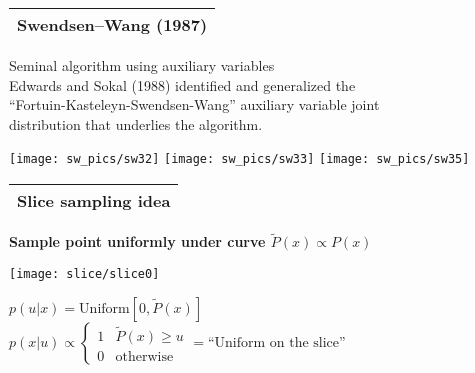 \documentclass[25pt,landscape]{foils}
\newcommand{\Gray}{\textcolor{mygray}}
\newcommand{\Green}{\textcolor{mypine}}
\newcommand{\myfoilhead}[1]{
\newpage
\vspace*{-1cm}
\Gray{
\begin{tabular*}{\textwidth}{l}
{\bf \Huge #1} \\
\bottomrule
\end{tabular*}}}
\newcommand{\te}{\!=\!}
\begin{document}
\vfill




\myfoilhead{Swendsen--Wang (1987)}

\vfill

Seminal algorithm using auxiliary variables\\

Edwards and Sokal (1988) identified and generalized the\\
``Fortuin-Kasteleyn-Swendsen-Wang'' auxiliary variable joint\\
distribution that underlies the algorithm.

\vfill

\hspace*{-0.9cm}
\texttt{[image: sw\_pics/sw32]}
\texttt{[image: sw\_pics/sw33]}
\texttt{[image: sw\_pics/sw35]}

\vspace*{-0.5cm}

\myfoilhead{Slice sampling idea}

\vspace*{1.5cm}

\Green{\bf Sample point uniformly under curve $\tilde{P}(x)\propto P(x)$}

\vfill

\centerline{\texttt{[image: slice/slice0]}}

\vfill

\hspace*{2cm} $p(u|x)=\mbox{Uniform}[0,\tilde{P}(x)]$\\[0.5in]
\hspace*{2cm} $p(x|u)\propto \begin{cases} 1 & \tilde{P}(x)\ge u\\
                                           0 & \mbox{otherwise}
                                       \end{cases} = \mbox{``Uniform on the slice''}$
\end{document}
